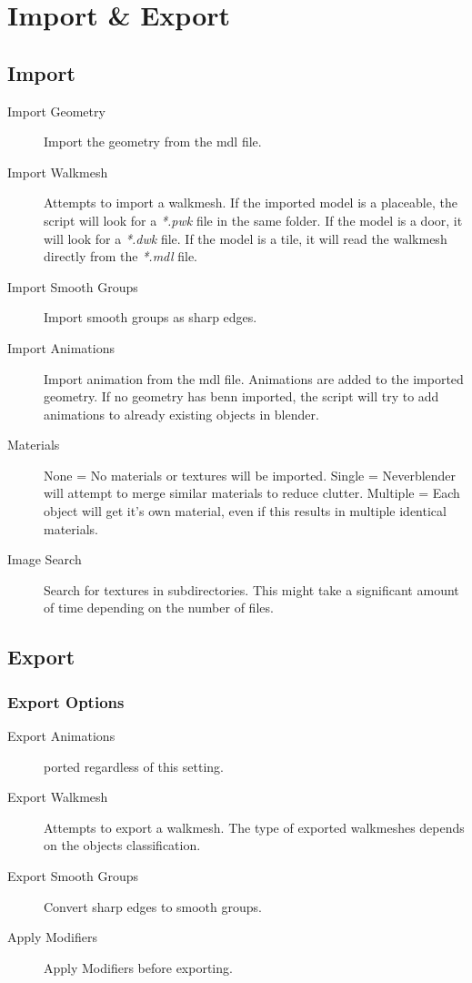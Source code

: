 \section{Import \& Export}

\subsection{Import}

\begin{description}
    \item[Import Geometry] Import the geometry from the mdl file.
    \item[Import Walkmesh] Attempts to import a walkmesh. If the imported model is a placeable, the script will look for a {\textit{*.pwk}} file in the same folder. If the model is a door, it will look for a {\textit{*.dwk}} file. If the model is a tile, it will read the walkmesh directly from the {\textit{*.mdl}} file.
    \item[Import Smooth Groups] Import smooth groups as sharp edges.
    \item[Import Animations] Import animation from the mdl file. Animations are added to the imported geometry. If no geometry has benn imported, the script will try to add animations to already existing objects in blender.
    \item[Materials] None = No materials or textures will be imported. Single = Neverblender will attempt to merge similar materials to reduce clutter. Multiple = Each object will get it's own material, even if this results in multiple identical materials.
    \item[Image Search] Search for textures in subdirectories. This might take a significant amount of time depending on the number of files.
\end{description}


\subsection{Export}

\subsubsection*{Export Options}
\begin{description}
    \item[Export Animations] ported regardless of this setting.
    \item[Export Walkmesh] Attempts to export a walkmesh. The type of exported walkmeshes depends on the objects classification.
    \item[Export Smooth Groups] Convert sharp edges to smooth groups.
    \item[Apply Modifiers] Apply Modifiers before exporting.
\end{description}
